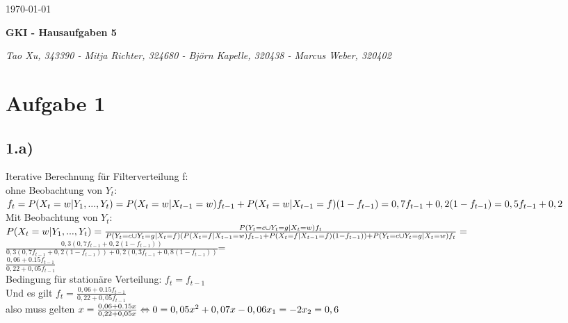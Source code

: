 \documentclass[a4paper]{article}
\begin{document}
  \begin{flushright}
    \today
  \end{flushright}
  \begin{center}
    \Large\textbf{{GKI - Hausaufgaben 5}}\\
  \end{center}

  \begin{center}
        \large\textsl{Tao Xu, 343390 - Mitja Richter, 324680 - Björn Kapelle, 320438 - Marcus Weber, 320402}\\
  \end{center}
  
\section*{Aufgabe 1}

\subsection*{1.a)}
Iterative Berechnung für Filterverteilung f:\\
ohne Beobachtung von $Y_t$:\\

$f_t= P(X_t=w|Y_1,...,Y_t) =\\ P(X_t=w|X_{t-1}=w)f_{t-1} + P(X_t=w|X_{t-1}=f)(1-f_{t-1}) = \\
0,7f_{t-1} +0,2(1-f_{t-1}) =\\
0,5f_{t-1}+0,2$\\

Mit Beobachtung von $Y_t$:\\
$P(X_t=w|Y_1,...,Y_t) = \\
\frac{P(Y_t=c\cup Y_t=g|X_t=w)f_t}{P(Y_t=c\cup Y_t=g|X_t=f)(P(X_t=f|X_{t-1}=w)f_{t-1} + P(X_t=f|X_{t-1}=f)(1-f_{t-1})) + P(Y_t=c\cup Y_t=g|X_t=w)f_t}=\\$
$\frac{0,3(0,7f_{t-1} +0,2(1-f_{t-1}))}{0,3(0,7f_{t-1} +0,2(1-f_{t-1}))+0,2(0,3f_{t-1} +0,8(1-f_{t-1}))} $=\\
$\frac{0,06+0.15f_{t-1}}{0,22+0,05f_{t-1}}
$\\

Bedingung für stationäre Verteilung: $f_t = f_{t-1}$\\
Und es gilt $f_t=\frac{0,06+0.15f_{t-1}}{0,22+0,05f_{t-1}}$\\
also muss gelten $x=\frac{0,06+0.15x}{0,22+0,05x}\\
\Leftrightarrow 0=0,05x^2+0,07x -0,06\\
x_1=-2\\
x_2=0,6
$\\
\end{document}
